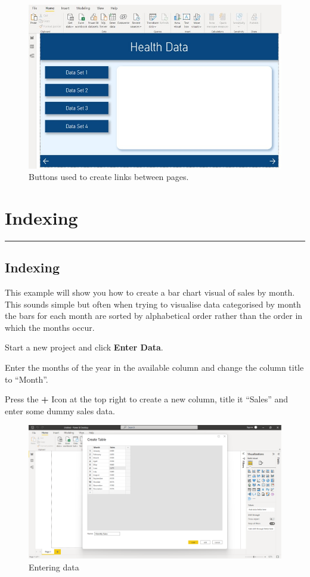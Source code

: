 \documentclass[
]{book}
\begin{document}
\begin{figure}
\centering
\includegraphics{bi13.jpg}
\caption{Buttons used to create links between pages.}
\end{figure}

\hypertarget{indexing}{%
\chapter{Indexing}\label{indexing}}

\begin{center}\rule{0.5\linewidth}{0.5pt}\end{center}

\hypertarget{indexing-1}{%
\section{Indexing}\label{indexing-1}}

This example will show you how to create a bar chart visual of sales by month. This sounds simple but often when trying to visualise data categorised by month the bars for each month are sorted by alphabetical order rather than the order in which the months occur.

Start a new project and click \textbf{Enter Data}.

Enter the months of the year in the available column and change the column title to ``Month''.

Press the \textbf{+} Icon at the top right to create a new column, title it ``Sales'' and enter some dummy sales data.

\begin{figure}
\centering
\includegraphics{bi14.png}
\caption{Entering data}
\end{figure}
\end{document}
